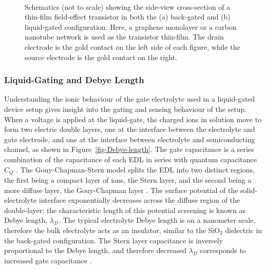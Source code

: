 \documentclass[
  a4paper,
]{scrbook}
\begin{document}
\begin{figure}
\begin{minipage}[t]{0.01\linewidth}
{\centering 

~

}

\end{minipage}%

\caption[Schematics showing cross-sections of a thin-film
transistor.]{\label{fig-gating-schematics}Schematics (not to scale)
showing the side-view cross-section of a thin-film field-effect
transistor in both the (a) back-gated and (b) liquid-gated
configuration. Here, a graphene monolayer or a carbon nanotube network
is used as the transistor thin-film. The drain electrode is the gold
contact on the left side of each figure, while the source electrode is
the gold contact on the right.}

\end{figure}

\hypertarget{liquid-gating-and-debye-length}{%
\subsubsection*{Liquid-Gating and Debye
Length}\label{liquid-gating-and-debye-length}}

Understanding the ionic behaviour of the gate electrolyte used in a
liquid-gated device setup gives insight into the gating and sensing
behaviour of the setup. When a voltage is applied at the liquid-gate,
the charged ions in solution move to form two electric double layers,
one at the interface between the electrolyte and gate electrode, and one
at the interface between electrolyte and semiconducting channel, as
shown in Figure~\ref{fig-Debye-length}. The gate capacitance is a series
combination of the capacitance of each EDL in series with quantum
capacitance \(C_{Q}\) \autocite{Heller2010,Kireev2017,Shkodra2021}. The
Gouy-Chapman-Stern model splits the EDL into two distinct regions, the
first being a compact layer of ions, the Stern layer, and the second
being a more diffuse layer, the Gouy-Chapman layer
\autocite{Tiwari2022}. The surface potential of the solid-electrolyte
interface exponentially decreases across the diffuse region of the
double-layer; the characteristic length of this potential screening is
known as Debye length, \(\lambda_D\). The typical electrolyte Debye
length is on a nanometer scale, therefore the bulk electrolyte acts as
an insulator, similar to the SiO\(_2\) dielectric in the back-gated
configuration. The Stern layer capacitance is inversely proportional to
the Debye length, and therefore decreased \(\lambda_D\) corresponds to
increased gate capacitance
\autocite{Heller2010,Ohno2015,Shkodra2021,Yao2021}.
\end{document}
